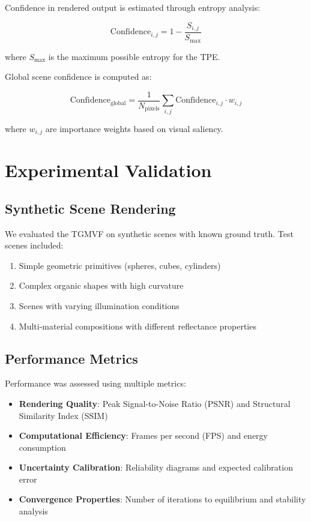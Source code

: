 \documentclass[12pt,a4paper]{article}
\begin{document}
Confidence in rendered output is estimated through entropy analysis:

\begin{equation}
\text{Confidence}_{i,j} = 1 - \frac{S_{i,j}}{S_{\text{max}}}
\end{equation}

where $S_{\text{max}}$ is the maximum possible entropy for the TPE.

Global scene confidence is computed as:

\begin{equation}
\text{Confidence}_{\text{global}} = \frac{1}{N_{\text{pixels}}} \sum_{i,j} \text{Confidence}_{i,j} \cdot w_{i,j}
\end{equation}

where $w_{i,j}$ are importance weights based on visual saliency.

\section{Experimental Validation}

\subsection{Synthetic Scene Rendering}

We evaluated the TGMVF on synthetic scenes with known ground truth. Test scenes included:

\begin{enumerate}
\item Simple geometric primitives (spheres, cubes, cylinders)
\item Complex organic shapes with high curvature
\item Scenes with varying illumination conditions
\item Multi-material compositions with different reflectance properties
\end{enumerate}

\subsection{Performance Metrics}

Performance was assessed using multiple metrics:

\begin{itemize}
\item \textbf{Rendering Quality}: Peak Signal-to-Noise Ratio (PSNR) and Structural Similarity Index (SSIM)
\item \textbf{Computational Efficiency}: Frames per second (FPS) and energy consumption
\item \textbf{Uncertainty Calibration}: Reliability diagrams and expected calibration error
\item \textbf{Convergence Properties}: Number of iterations to equilibrium and stability analysis
\end{itemize}
\end{document}
